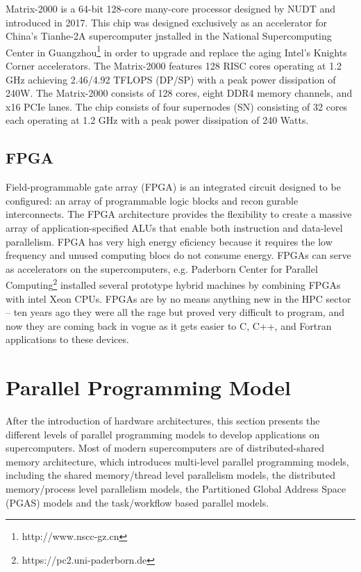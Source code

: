 Matrix-2000 \cite{matrix-2000} is a 64-bit 128-core many-core processor designed by NUDT and introduced in 2017. This chip was designed exclusively as an accelerator for China's Tianhe-2A supercomputer jnstalled in the National Supercomputing Center in Guangzhou\footnote{http://www.nscc-gz.cn} in order to upgrade and replace the aging Intel's Knights Corner accelerators. The Matrix-2000 features 128 RISC cores operating at 1.2 GHz achieving 2.46/4.92 TFLOPS (DP/SP) with a peak power dissipation of 240W. The Matrix-2000 consists of 128 cores, eight DDR4 memory channels, and x16 PCIe lanes. The chip consists of four supernodes (SN) consisting of 32 cores each operating at 1.2 GHz with a peak power dissipation of 240 Watts.

\subsection{FPGA}

Field-programmable gate array (FPGA) is an integrated circuit designed to be configured: an array of programmable logic blocks and recon gurable interconnects. The FPGA architecture provides the flexibility to create a massive array of application-specified ALUs that enable both instruction and data-level parallelism. FPGA has very high energy eficiency because it requires the low frequency and unused computing blocs do not consume energy. FPGAs can serve as accelerators on the supercomputers, e.g. Paderborn Center for Parallel Computing\footnote{https://pc2.uni-paderborn.de} installed several prototype hybrid machines by combining FPGAs with intel Xeon CPUs. FPGAs are by no means anything new in the HPC sector – ten years ago they were all the rage but proved very difficult to program, and now they are coming back in vogue as it gets easier to C, C++, and Fortran applications to these devices.


\section{Parallel Programming Model}\label{Parallel Programming Model}

After the introduction of hardware architectures, this section presents the different levels of parallel programming models to develop applications on supercomputers. Most of modern supercomputers are of distributed-shared memory architecture, which introduces multi-level parallel programming models, including the shared memory/thread level parallelism models, the distributed memory/process level parallelism models, the Partitioned Global Address Space (PGAS) models and the task/workflow based parallel models.

